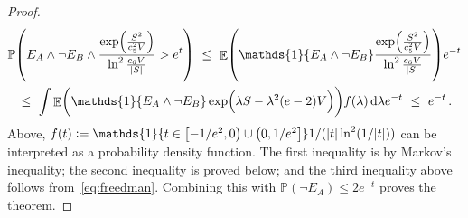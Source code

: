 \documentclass[11pt]{article}
\DeclareMathOperator{\E}{\mathbb{E}}
\renewcommand{\P}{\ensuremath{\mathbb{P}}}
\theoremstyle{remark}
\theoremstyle{definition}
\renewcommand\abs[1]{|#1|} %
\newcommand\ind[1]{\ensuremath{\mathds{1}\{#1\}}}
\newcommand\Parens[1]{\mleft(#1\mright)}
\begin{document}
\begin{proof}
\begin{multline*}
    \P\Parens{
      E_A \wedge \neg E_B \wedge
      \frac{
        \exp\Parens{\frac{S^2}{c_5^2V}}
      }{
        \ln^2\frac{c_6V}{|S|}
      }
      > e^t
    }
    \ \leq \
    \E\Parens{
      \ind{E_A \wedge \neg E_B}
      \frac{
        \exp\Parens{\frac{S^2}{c_5^2V}}
      }{
        \ln^2\frac{c_6V}{|S|}
      }
    }
    e^{-t}
    \\
    \ \leq \
    \int
    \E\Parens{
      \ind{E_A \wedge \neg E_B}
      \exp\Parens{ \lambda S - \lambda^2 (e-2) V }
    }
    f(\lambda) \dif\lambda
    e^{-t}
    \ \leq \
    e^{-t}
    \,.
  \end{multline*}
  Above, $f(t) := \ind{t \in \intco{-1/e^2,0} \cup \intoc{0,1/e^2}}
  1/(\abs{t}\ln^2(1/\abs{t}))$ can be interpreted as a probability
  density function.
  The first inequality is by Markov's inequality; the second
  inequality is proved below; and the third inequality above follows
  from~\eqref{eq:freedman}.
  Combining this with $\P(\neg E_A) \leq 2e^{-t}$ proves the theorem.


\end{proof}
\end{document}

